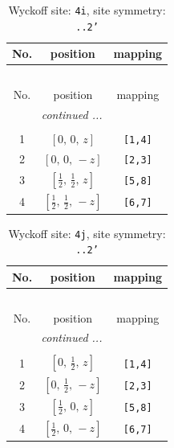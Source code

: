 \documentclass[fleqn,8pt]{jsarticle}
\begin{document}
\renewcommand{\arraystretch}{1.2}
\begin{longtable}{ccc}
\caption{Wyckoff site: {\tt 4i}, site symmetry: {\tt ..2'}}
 \\
 \hline \hline
No. & position & mapping \\ \hline \endfirsthead

\multicolumn{2}{l}{\tablename\ \thetable{}} \\
 \hline \hline
No. & position & mapping \\ \hline \endhead

 \hline \hline
\multicolumn{2}{r}{\footnotesize\it continued ...} \\ \endfoot

 \hline \hline
\multicolumn{2}{r}{} \\ \endlastfoot

1 & $\left[ 0,\, 0,\, z \right]$ & {\tt [1,4]} \\ \hline
2 & $\left[ 0,\, 0,\, - z \right]$ & {\tt [2,3]} \\ \hline
3 & $\left[ \frac{1}{2},\, \frac{1}{2},\, z \right]$ & {\tt [5,8]} \\ \hline
4 & $\left[ \frac{1}{2},\, \frac{1}{2},\, - z \right]$ & {\tt [6,7]} \\
\end{longtable}
\renewcommand{\arraystretch}{1.2}
\begin{longtable}{ccc}
\caption{Wyckoff site: {\tt 4j}, site symmetry: {\tt ..2'}}
 \\
 \hline \hline
No. & position & mapping \\ \hline \endfirsthead

\multicolumn{2}{l}{\tablename\ \thetable{}} \\
 \hline \hline
No. & position & mapping \\ \hline \endhead

 \hline \hline
\multicolumn{2}{r}{\footnotesize\it continued ...} \\ \endfoot

 \hline \hline
\multicolumn{2}{r}{} \\ \endlastfoot

1 & $\left[ 0,\, \frac{1}{2},\, z \right]$ & {\tt [1,4]} \\ \hline
2 & $\left[ 0,\, \frac{1}{2},\, - z \right]$ & {\tt [2,3]} \\ \hline
3 & $\left[ \frac{1}{2},\, 0,\, z \right]$ & {\tt [5,8]} \\ \hline
4 & $\left[ \frac{1}{2},\, 0,\, - z \right]$ & {\tt [6,7]} \\
\end{longtable}
\end{document}
